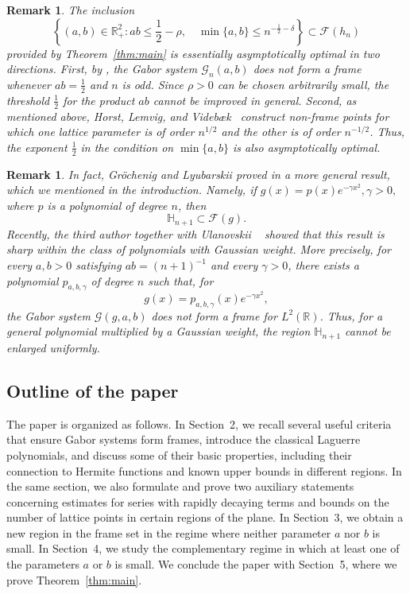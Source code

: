 \documentclass[11pt]{amsart}
\numberwithin{equation}{section}
\newtheorem{remark}[theorem]{Remark}
\newcommand{\R}{{\mathbb R}}
\begin{document}
\begin{remark}
The inclusion
\begin{equation}
    \left\{(a,b)\in\R_+^2:
    ab\leq\frac12-\rho,\quad
    \min\{a,b\}\leq n^{-\frac12-\delta}
    \right\}
    \subset \mathcal{F}(h_n)
\end{equation}
provided by Theorem~\ref{thm:main} is essentially asymptotically optimal in two directions.
First, by \cite{MR3027914}, the Gabor system $\mathcal{G}_n(a,b)$ does not form a frame whenever
$ab=\frac12$ and $n$ is odd. Since $\rho>0$ can be chosen arbitrarily small, the threshold $\frac12$ for the product $ab$ cannot be improved in general.
Second, as mentioned above, Horst, Lemvig, and Videb{\ae}k~\cite[Section~5.3]{MR4849800}
construct non-frame points for which one lattice parameter is of order $n^{1/2}$ and the other is of order $n^{-1/2}$. Thus, the exponent $\frac{1}{2}$ in the condition on $\min\{a,b\}$ is also asymptotically optimal.
\end{remark}

\begin{remark}
In fact, Gr\"ochenig and Lyubarskii proved in \cite{MR2529475} a more general
result, which we mentioned in the introduction. Namely, if
$g(x)=p(x)e^{-\gamma x^2}, \gamma>0,$ where $p$ is a polynomial of degree $n$, then
\begin{equation}
    \mathbb{H}_{n+1}\subset\mathcal{F}(g).
\end{equation}
Recently, the third author together with Ulanovskii ~\cite{ulanovskii26} showed that this result
is sharp within the class of polynomials with Gaussian weight. More precisely,
for every $a,b>0$ satisfying $ab=(n+1)^{-1}$ and every $\gamma>0$, there
exists a polynomial $p_{a,b,\gamma}$ of degree $n$ such that, for
$$g(x)=p_{a,b,\gamma}(x)e^{-\gamma x^2},$$
the Gabor system $\mathcal{G}(g,a,b)$ does not form a frame for $L^2(\R)$.
Thus, for a general polynomial multiplied by a Gaussian weight, the region
$\mathbb{H}_{n+1}$ cannot be enlarged uniformly.
\end{remark}

\subsection{Outline of the paper}
The paper is organized as follows. In Section~2, we recall several useful criteria that ensure Gabor systems form frames, introduce the classical Laguerre polynomials, and discuss some of their basic properties, including their connection to Hermite functions and known upper bounds in different regions. In the same section, we also formulate and prove two auxiliary statements concerning estimates for series with rapidly decaying terms and bounds on the number of lattice points in certain regions of the plane. In Section~3, we obtain a new region in the frame set in the regime where neither parameter $a$ nor $b$ is small. In Section~4, we study the complementary regime in which at least one of the parameters $a$ or $b$ is small. We conclude the paper with Section~5, where we prove Theorem~\ref{thm:main}.
\end{document}
